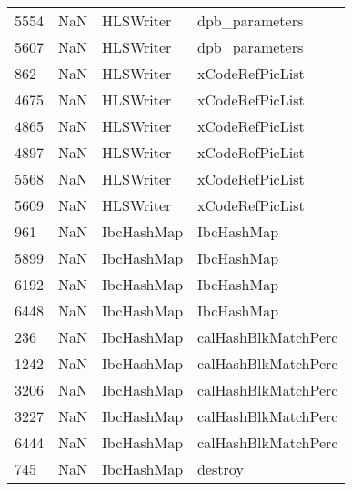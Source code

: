 \begin{tabular}{llll}
5554 &                   NaN &                  HLSWriter &                            dpb\_parameters \\
5607 &                   NaN &                  HLSWriter &                            dpb\_parameters \\
862  &                   NaN &                  HLSWriter &                           xCodeRefPicList \\
4675 &                   NaN &                  HLSWriter &                           xCodeRefPicList \\
4865 &                   NaN &                  HLSWriter &                           xCodeRefPicList \\
4897 &                   NaN &                  HLSWriter &                           xCodeRefPicList \\
5568 &                   NaN &                  HLSWriter &                           xCodeRefPicList \\
5609 &                   NaN &                  HLSWriter &                           xCodeRefPicList \\
961  &                   NaN &                 IbcHashMap &                                IbcHashMap \\
5899 &                   NaN &                 IbcHashMap &                                IbcHashMap \\
6192 &                   NaN &                 IbcHashMap &                                IbcHashMap \\
6448 &                   NaN &                 IbcHashMap &                                IbcHashMap \\
236  &                   NaN &                 IbcHashMap &                       calHashBlkMatchPerc \\
1242 &                   NaN &                 IbcHashMap &                       calHashBlkMatchPerc \\
3206 &                   NaN &                 IbcHashMap &                       calHashBlkMatchPerc \\
3227 &                   NaN &                 IbcHashMap &                       calHashBlkMatchPerc \\
6444 &                   NaN &                 IbcHashMap &                       calHashBlkMatchPerc \\
745  &                   NaN &                 IbcHashMap &                                   destroy \\

\end{tabular}
